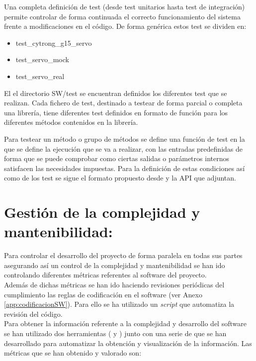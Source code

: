     Una completa definición de test (desde test unitarios hasta test de integración) permite controlar de forma continuada el correcto funcionamiento del sistema frente a modificaciones en el código. De forma genérica estos test se dividen en:

    \begin{itemize}
        \item test\_cytrong\_g15\_servo 
        \item test\_servo\_mock
        \item test\_servo\_real
    \end{itemize}

    El el directorio SW/test se encuentran definidos los diferentes test que se realizan. Cada fichero de test, destinado a testear de forma parcial o completa una librería, tiene diferentes test definidos en formato de función para los diferentes métodos contenidos en la librería.

    Para testear un método o grupo de métodos se define una función de test en la que se define la ejecución que se va a realizar, con las entradas predefinidas de forma que se puede comprobar como ciertas salidas o parámetros internos satisfacen las necesidades impuestas. Para la definición de estas condiciones así como de los test se sigue el formato propuesto desde  y la API que adjuntan.


\section{Gestión de la complejidad y mantenibilidad:} \label{sec:SW:gestion_complejidad}
    Para controlar el desarrollo del proyecto de forma paralela en todas sus partes asegurando así un control de la complejidad y mantenibilidad se han ido controlando diferentes métricas referentes al software del proyecto. 
    \\ 
    
    Además de dichas métricas se han ido haciendo revisiones periódicas del cumplimiento las reglas de codificación en el software (ver Anexo \ref{app:codificacionSW}). Para ello se ha utilizado un \textit{script}  que automatiza la revisión del código.
    \\
    
    Para obtener la información referente a la complejidad y desarrollo del software se han utilizado dos herramientas ( y ) junto con una serie de  que se han desarrollado para automatizar la obtención y visualización de la información. Las métricas que se han obtenido y valorado son:
    
